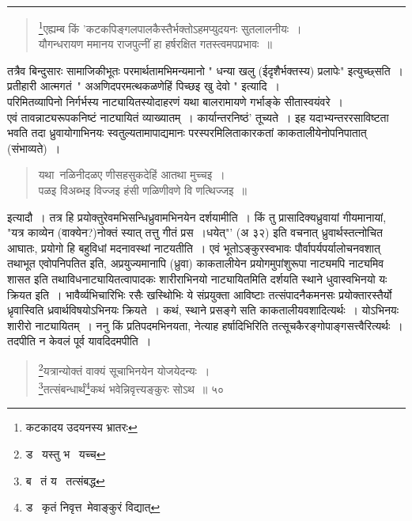 \documentclass[11pt, openany]{book}
\begin{document}
{\hrule

\vspace{2mm}

\begin{sloppypar}
\begin{quote}
 {\qt \renewcommand{\thefootnote}{*}\footnote{कटकादय उदयनस्य भ्रातरः }एह्यम्ब किं 'कटकपिङ्गलपालकैस्तैर्भक्तोऽहमप्युदयनः सुतलालनीयः~। \\
यौगन्धरायण ममानय राजपुत्नीं हा हर्षरक्षित गतस्त्वमपप्रभावः~॥ } 
\end{quote}
\end{sloppypar}

तत्रैव बिन्दुसारः सामाजिकीभूतः परमार्थतामभिमन्यमानो " धन्या खलु (ईदृशैर्भक्तस्य) प्रलापेः" इत्युच्छ्सति~। प्रतीहारी आत्मगतं\textendash\ " अअणिदपरमत्थकळणेहिं पिच्छइ खु देवो " इत्यादि~। \\

परिमितव्यापिनो निर्गर्भस्य नाट्यायितस्योदाहरणं यथा बालरामायणे गर्भाङ्के सीतास्वयंवरे~।\\ 

एवं तावन्नाट्यरूपकनिष्टं नाट्यायितं व्याख्यातम्~। कार्यान्तरनिष्ठं' तूच्यते~। इह यदाभ्यन्तररसाविष्टता भवति तदा ध्रुवायोगाभिनयः स्वतुल्यतामापाद्यमानः परस्परमिलिताकारकतां काकतालीयेनोपनिपातात् (संभाव्यते)~। \begin{quote}
 {\qt यथा\textendash\ नळिनीदळए णीसहसुकदेहिं आतथा मुच्चइ~।\\ 
 पळइ विअब्भइ विज्जइ हंसी णळिणीवणे वि णत्थिज्जइ~॥ }
\end{quote}

\small{इत्यादौ~। तत्र हि प्रयोक्तुरेवमभिसन्धिध्रुवामभिनयेन दर्शयामीति~। किं तु प्रासादिक्यध्रुवायां गीयमानायां, "यत्र काव्येन (वाक्येन?)नोक्तं स्यात् तत्तु गीतं प्रस~।धयेत्"' (अ ३२) इति वचनात् ध्रुवार्थस्तत्नोचित आघातः, प्रयोगो हि बहुविधां मदनावस्थां नाटयतीति~। एवं भूतोऽङ्कुरस्वभावः पौर्वापर्यपर्यालोचनवशात् तथाभूत एवोपनिपतित इति, अप्रयुज्यमानापि (ध्रुवा) काकतालीयेन प्रयोगमुपांशुरूपा नाट्यमपि नाट्यमिव शासत इति तथाविधनाट्यायितत्वापादकः शारीराभिनयो नाट्यायितमिति दर्शयति स्थाने धुवास्वभिनयो यः क्रियत इति~। भावैर्व्यभिचारिभिः रसैः खस्थोिभिः ये संप्रयुक्ता आविष्टाः तत्संपादनैकमनसः प्रयोक्तारस्तैर्यो ध्रृवास्विति ध्रवार्थविषयोऽभिनयः क्रियते~। कथं, स्थाने प्रसङ्गे सति काकतालीयवशादित्यर्थः~। योऽभिनयः शारीरो नाट्यायितम्~। ननु किं प्रतिपदमभिनयता, नेत्याह हर्षादिभिरिति तत्सूचकैरङ्गोपाङ्गसत्त्वैरित्यर्थः~। तदपीति न केवलं पूर्व यावदिदमपीति~।}

\newpage

\begin{quote}
 {\na \renewcommand{\thefootnote}{1}\footnote{ड \textendash\ यस्तु भ \textendash\ यच्च}यत्रान्योक्तं वाक्यं सूचाभिनयेन योजयेदन्यः~। \\
\renewcommand{\thefootnote}{2}\footnote{ब \textendash\ तं य \textendash\ तत्संबद्ध}तत्संबन्धार्थं\renewcommand{\thefootnote}{3}\footnote{ड \textendash\ कृतं निवृत्त\textendash\ मेवाङ्कुरं विद्यात् }कथं भवेन्निवृत्त्यङ्कुरः सोऽथ~॥ ५० 

}
\end{quote}}
\end{document}
